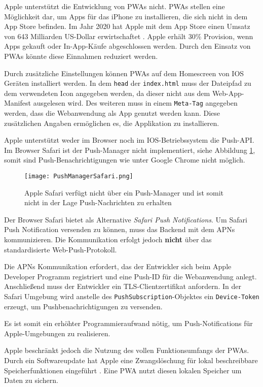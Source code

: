 Apple unterstützt die Entwicklung von PWAs nicht. PWAs stellen  eine Möglichkeit dar, um Apps für das iPhone zu installieren, die sich nicht in dem App Store befinden. Im Jahr 2020 hat Apple mit dem App Store einen Umsatz von 643 Milliarden US-Dollar erwirtschaftet \cite{Kirchenbauer2021}. Apple erhält 30\% Provision, wenn Apps gekauft oder In-App-Käufe abgeschlossen werden. Durch den Einsatz von PWAs könnte diese Einnahmen reduziert werden.

Durch zusätzliche Einstellungen können PWAs auf dem Homescreen von IOS Geräten installiert werden. In dem \texttt{head} der \texttt{index.html} muss der Dateipfad zu dem verwendeten Icon angegeben werden, da dieser nicht aus dem Web-App-Manifest ausgelesen wird. 
Des weiteren muss in einem \texttt{Meta-Tag} angegeben werden, dass die Webanwendung als App genutzt werden kann. Diese zusätzlichen Angaben ermöglichen es, die Applikation zu installieren. 

Apple unterstützt weder im Browser noch im IOS-Betriebssystem die Push-API. Im Browser Safari ist der Push-Manager nicht implementiert, siehe Abbildung \ref{img:PushManagerBrowser}, somit sind Push-Benachrichtigungen wie unter Google Chrome nicht möglich. 

\begin{figure}[!htb]
    \centering
    \texttt{[image: PushManagerSafari.png]}
    \caption{Apple Safari verfügt nicht über ein Push-Manager und ist somit nicht in der Lage Push-Nachrichten zu erhalten}
    \label{img:PushManagerBrowser}
\end{figure}


Der Browser Safari bietet als Alternative \textit{Safari Push Notifications}. Um Safari Push Notification versenden zu können, muss das Backend mit dem \ac*{APNs} kommunizieren. Die Kommunikation erfolgt jedoch \textbf{nicht} über das standardisierte Web-Push-Protokoll.

Die APNs Kommunikation erfordert, das der Entwickler sich beim Apple Developer Programm registriert und eine Push-ID für die Webanwendung anlegt. Anschließend muss der Entwickler ein \ac*{TLS}-Clientzertifikat anfordern. In der Safari Umgebung wird anstelle des \texttt{PushSubscription}-Objektes ein \texttt{Device-Token} erzeugt, um Pushbenachrichtigungen zu versenden. 

Es ist somit ein erhöhter Programmieraufwand nötig, um Push-Notifications für Apple-Umgebungen zu realisieren.


Apple beschränkt jedoch die Nutzung des vollen Funktionsumfangs der PWAs. Durch ein Softwareupdate hat Apple eine Zwangslöschung für lokal beschreibbare Speicherfunktionen eingeführt \cite{t3n2020}. Eine PWA nutzt diesen lokalen Speicher um Daten zu sichern.